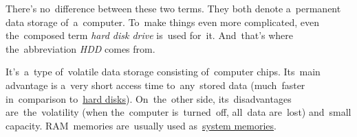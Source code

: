 \label{harddiskdrive}
There's no~difference between these two terms.
They both denote a~permanent data storage of~a~computer.
To~make things even more complicated, even the~composed term \textit{hard disk drive} is~used for~it.
And~that's where the~abbreviation \textit{HDD} comes from.

\label{ram}
It's~a~type of~volatile data storage consisting of~computer chips.
Its~main advantage is a~very short access time to~any~stored data (much~faster in~comparison to~\hyperref[harddiskdrive]{hard disks}).
On~the~other side, its~disadvantages are~the~volatility (when the~computer is~turned~off, all~data are~lost) and~small capacity.
RAM~memories are~usually used as~\hyperref[systemmemory]{system memories}.

